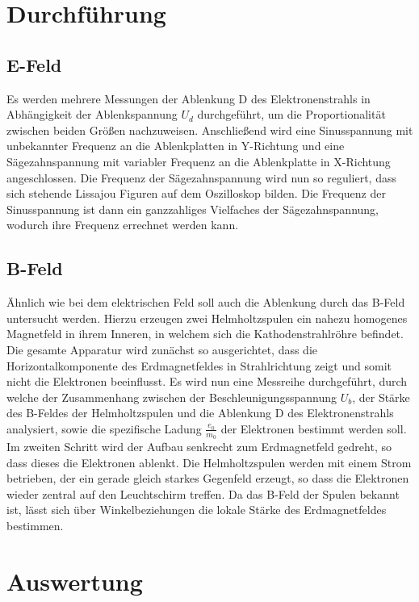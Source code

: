 \section{Durchführung}

\subsection{E-Feld}
Es werden mehrere Messungen der Ablenkung D des Elektronenstrahls in Abhängigkeit der Ablenkspannung $U_d$ durchgeführt, um die Proportionalität zwischen beiden Größen nachzuweisen.
Anschließend wird eine Sinusspannung mit unbekannter Frequenz an die Ablenkplatten in Y-Richtung und eine Sägezahnspannung mit variabler Frequenz an die Ablenkplatte in X-Richtung angeschlossen.
Die Frequenz der Sägezahnspannung wird nun so reguliert, dass sich stehende Lissajou Figuren auf dem Oszilloskop bilden. Die Frequenz der Sinusspannung ist dann ein ganzzahliges Vielfaches der Sägezahnspannung, wodurch ihre Frequenz errechnet werden kann.
\subsection{B-Feld}
Ähnlich wie bei dem elektrischen Feld soll auch die Ablenkung durch das B-Feld untersucht werden. Hierzu erzeugen zwei Helmholtzspulen ein nahezu homogenes Magnetfeld in ihrem Inneren, in welchem sich die Kathodenstrahlröhre befindet. Die gesamte Apparatur wird zunächst so ausgerichtet, dass die Horizontalkomponente des Erdmagnetfeldes in Strahlrichtung zeigt und somit nicht die Elektronen beeinflusst.
Es wird nun eine Messreihe durchgeführt, durch welche der Zusammenhang zwischen der Beschleunigungsspannung $U_b$, der Stärke des B-Feldes der Helmholtzspulen und die Ablenkung D des Elektronenstrahls analysiert, sowie die spezifische Ladung $\frac{e_0}{m_0}$ der Elektronen bestimmt werden soll.\\
Im zweiten Schritt wird der Aufbau senkrecht zum Erdmagnetfeld gedreht, so dass dieses die Elektronen ablenkt. Die Helmholtzspulen werden mit einem Strom betrieben, der ein gerade gleich starkes Gegenfeld erzeugt, so dass die Elektronen wieder zentral auf den Leuchtschirm treffen. Da das B-Feld der Spulen bekannt ist, lässt sich über Winkelbeziehungen die lokale Stärke des Erdmagnetfeldes bestimmen.

\section{Auswertung}

